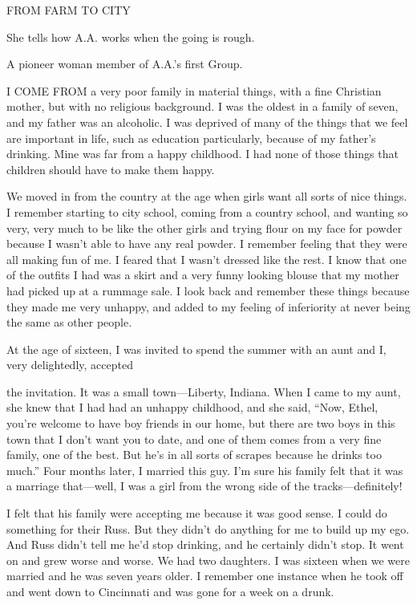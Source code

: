 
FROM FARM TO CITY

She tells how A.A. works when the going is rough.

A pioneer woman member of A.A.’s first Group.


      I COME FROM a very poor family in material things, with a fine Christian mother, but with no religious background. I was the oldest in a family of seven, and my father was an alcoholic. I was deprived of many of the things that we feel are important in life, such as education particularly, because of my father’s drinking. Mine was far from a happy childhood. I had none of those things that children should have to make them happy.

We moved in from the country at the age when girls want all sorts of nice things. I remember starting to city school, coming from a country school, and wanting so very, very much to be like the other girls and trying flour on my face for powder because I wasn’t able to have any real powder. I remember feeling that they were all making fun of me. I feared that I wasn’t dressed like the rest. I know that one of the outfits I had was a skirt and a very funny looking blouse that my mother had picked up at a rummage sale. I look back and remember these things because they made me very unhappy, and added to my feeling of inferiority at never being the same as other people.

At the age of sixteen, I was invited to spend the summer with an aunt and I, very delightedly, accepted

the invitation. It was a small town—Liberty, Indiana. When I came to my aunt, she knew that I had had an unhappy childhood, and she said, “Now, Ethel, you’re welcome to have boy friends in our home, but there are two boys in this town that I don’t want you to date, and one of them comes from a very fine family, one of the best. But he’s in all sorts of scrapes because he drinks too much.” Four months later, I married this guy. I’m sure his family felt that it was a marriage that—well, I was a girl from the wrong side of the tracks—definitely!

I felt that his family were accepting me because it was good sense. I could do something for their Russ. But they didn’t do anything for me to build up my ego. And Russ didn’t tell me he’d stop drinking, and he certainly didn’t stop. It went on and grew worse and worse. We had two daughters. I was sixteen when we were married and he was seven years older. I remember one instance when he took off and went down to Cincinnati and was gone for a week on a drunk.

